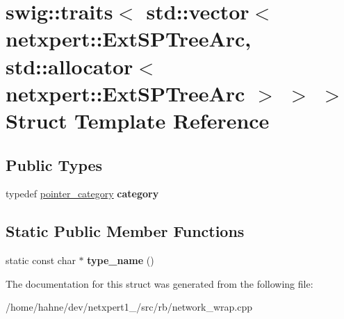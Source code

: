 \hypertarget{structswig_1_1traits_3_01std_1_1vector_3_01netxpert_1_1ExtSPTreeArc_00_01std_1_1allocator_3_01ne7c90b6fa14411a2e6ce514f528754abc}{}\section{swig\+:\+:traits$<$ std\+:\+:vector$<$ netxpert\+:\+:Ext\+S\+P\+Tree\+Arc, std\+:\+:allocator$<$ netxpert\+:\+:Ext\+S\+P\+Tree\+Arc $>$ $>$ $>$ Struct Template Reference}
\label{structswig_1_1traits_3_01std_1_1vector_3_01netxpert_1_1ExtSPTreeArc_00_01std_1_1allocator_3_01ne7c90b6fa14411a2e6ce514f528754abc}
\subsection*{Public Types}
\begin{DoxyCompactItemize}
\item 
typedef \hyperlink{structswig_1_1pointer__category}{pointer\+\_\+category} {\bfseries category}\hypertarget{structswig_1_1traits_3_01std_1_1vector_3_01netxpert_1_1ExtSPTreeArc_00_01std_1_1allocator_3_01ne7c90b6fa14411a2e6ce514f528754abc_acecc33293fb641f3973d6d5305f51b71}{}\label{structswig_1_1traits_3_01std_1_1vector_3_01netxpert_1_1ExtSPTreeArc_00_01std_1_1allocator_3_01ne7c90b6fa14411a2e6ce514f528754abc_acecc33293fb641f3973d6d5305f51b71}

\end{DoxyCompactItemize}
\subsection*{Static Public Member Functions}
\begin{DoxyCompactItemize}
\item 
static const char $\ast$ {\bfseries type\+\_\+name} ()\hypertarget{structswig_1_1traits_3_01std_1_1vector_3_01netxpert_1_1ExtSPTreeArc_00_01std_1_1allocator_3_01ne7c90b6fa14411a2e6ce514f528754abc_a9d7104b0dc597ff8959334966027d53e}{}\label{structswig_1_1traits_3_01std_1_1vector_3_01netxpert_1_1ExtSPTreeArc_00_01std_1_1allocator_3_01ne7c90b6fa14411a2e6ce514f528754abc_a9d7104b0dc597ff8959334966027d53e}

\end{DoxyCompactItemize}


The documentation for this struct was generated from the following file\+:\begin{DoxyCompactItemize}
\item 
/home/hahne/dev/netxpert1\+\_/src/rb/network\+\_\+wrap.\+cpp\end{DoxyCompactItemize}
